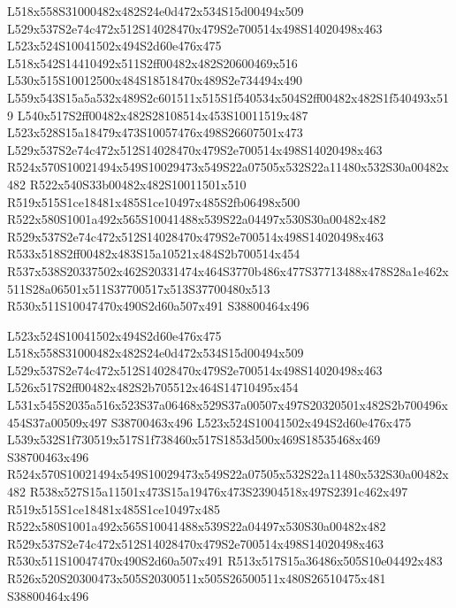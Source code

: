 \documentclass{article}
\begin{document}
\begin{multicols}{2}
L518x558S31000482x482S24e0d472x534S15d00494x509 L529x537S2e74c472x512S14028470x479S2e700514x498S14020498x463 L523x524S10041502x494S2d60e476x475 L518x542S14410492x511S2ff00482x482S20600469x516 L530x515S10012500x484S18518470x489S2e734494x490 L559x543S15a5a532x489S2c601511x515S1f540534x504S2ff00482x482S1f540493x519 L540x517S2ff00482x482S28108514x453S10011519x487 L523x528S15a18479x473S10057476x498S26607501x473 L529x537S2e74c472x512S14028470x479S2e700514x498S14020498x463 R524x570S10021494x549S10029473x549S22a07505x532S22a11480x532S30a00482x482 R522x540S33b00482x482S10011501x510 R519x515S1ce18481x485S1ce10497x485S2fb06498x500 R522x580S1001a492x565S10041488x539S22a04497x530S30a00482x482 R529x537S2e74c472x512S14028470x479S2e700514x498S14020498x463 R533x518S2ff00482x483S15a10521x484S2b700514x454 R537x538S20337502x462S20331474x464S3770b486x477S37713488x478S28a1e462x511S28a06501x511S37700517x513S37700480x513 R530x511S10047470x490S2d60a507x491 S38800464x496

L523x524S10041502x494S2d60e476x475 L518x558S31000482x482S24e0d472x534S15d00494x509 L529x537S2e74c472x512S14028470x479S2e700514x498S14020498x463 L526x517S2ff00482x482S2b705512x464S14710495x454 L531x545S2035a516x523S37a06468x529S37a00507x497S20320501x482S2b700496x454S37a00509x497 S38700463x496 L523x524S10041502x494S2d60e476x475 L539x532S1f730519x517S1f738460x517S1853d500x469S18535468x469 S38700463x496 R524x570S10021494x549S10029473x549S22a07505x532S22a11480x532S30a00482x482 R538x527S15a11501x473S15a19476x473S23904518x497S2391c462x497 R519x515S1ce18481x485S1ce10497x485 R522x580S1001a492x565S10041488x539S22a04497x530S30a00482x482 R529x537S2e74c472x512S14028470x479S2e700514x498S14020498x463 R530x511S10047470x490S2d60a507x491 R513x517S15a36486x505S10e04492x483 R526x520S20300473x505S20300511x505S26500511x480S26510475x481 S38800464x496


\end{multicols}
\end{document}
